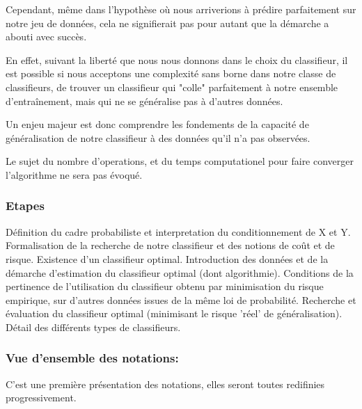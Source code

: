 \documentclass[a4paper]{article}
\theoremstyle{plain}
\begin{document}
Cependant, même dans l'hypothèse où nous arriverions à prédire parfaitement sur notre jeu de données, cela ne signifierait pas pour autant que la démarche a abouti avec succès. 

En effet, suivant la liberté que nous nous donnons dans le choix du classifieur, il est possible si nous acceptons une complexité sans borne dans notre classe de classifieurs, de trouver un classifieur qui "colle" parfaitement à notre ensemble d'entraînement, mais qui ne se généralise pas à d'autres données.

Un enjeu majeur est donc comprendre les fondements de la capacité de généralisation de notre classifieur à des données qu'il n'a pas observées.

Le sujet du nombre d'operations, et du temps computationel pour faire converger l'algorithme ne sera pas évoqué.

\subsubsection{Etapes}


\begin{outline}
\1 Définition du cadre probabiliste et interpretation du conditionnement de X et Y.
\1 Formalisation de la recherche de notre classifieur et des notions de coût et de risque.
\1 Existence d'un classifieur optimal.
\1 Introduction des données et de la démarche d'estimation du classifieur optimal (dont algorithmie).
\1 Conditions de la pertinence de l'utilisation du classifieur obtenu par minimisation du risque empirique, sur d'autres données issues de la même loi de probabilité.
\1 Recherche et évaluation du classifieur optimal (minimisant le risque 'réel' de généralisation).
\1 Détail des différents types de classifieurs.
\end{outline}

\subsubsection{Vue d'ensemble des notations:}

C'est une première présentation des notations, elles seront toutes redifinies progressivement.
\end{document}
